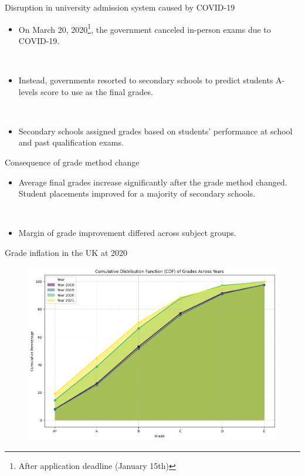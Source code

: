 \begin{frame}{Disruption in university admission system caused by COVID-19}
    \begin{itemize}
        \item On March 20, 2020\footnote{After application deadline (January 15th)}, the government canceled in-person exams due to COVID-19.

        \
        
        \item Instead, governments resorted to secondary schools to predict students A-levels score to use as the final grades.

        \

        \item Secondary schools assigned grades based on students' performance at school and past qualification exams.
    \end{itemize}
\end{frame}

\begin{frame}{Consequence of grade method change}
    \begin{itemize}
        \item Average final grades increase significantly after the grade method changed. Student placements improved for a majority of secondary schools.

        \

        \item Margin of grade improvement differed across subject groups.

    \end{itemize}
\end{frame}

\begin{frame}{Grade inflation in the UK at 2020}
\begin{figure}
    \centering
    \includegraphics[width=\textwidth]{Figures/GradeDistribution.png}
    \label{fig:enter-label}
\end{figure}
\end{frame}

